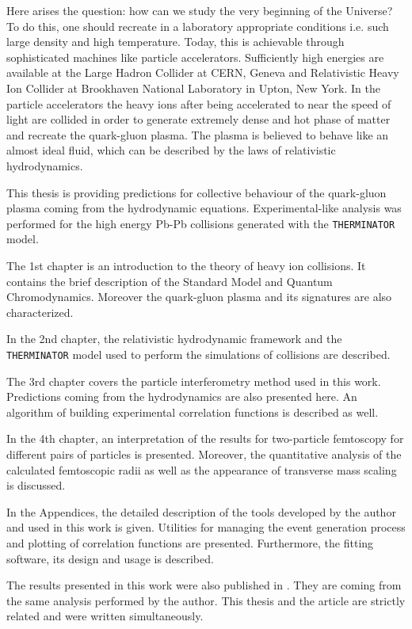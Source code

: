 Here arises the question: how can we study the very beginning of the Universe?
To do this, one should recreate in a laboratory appropriate conditions i.e. such large density and high temperature.
Today, this is achievable through sophisticated machines like particle accelerators.
Sufficiently high energies are available at the Large Hadron Collider at CERN, Geneva and Relativistic Heavy Ion Collider at Brookhaven National Laboratory in Upton, New York.
In the particle accelerators the heavy ions after being accelerated to near the speed of light are collided in order to generate extremely dense and hot phase of matter and recreate the quark-gluon plasma.
The plasma is believed to behave like an almost ideal fluid, which can be described by the laws of relativistic hydrodynamics.

This thesis is providing predictions for collective behaviour of the quark-gluon plasma coming from the hydrodynamic equations.
Experimental-like analysis was performed for the high energy Pb-Pb collisions generated with the \verb|THERMINATOR| model.

The 1st chapter is an introduction to the theory of heavy ion collisions.
It contains the brief description of the Standard Model and Quantum Chromodynamics.
Moreover the quark-gluon plasma and its signatures are also characterized.

In the 2nd chapter, the relativistic hydrodynamic framework and the \verb|THERMINATOR| model used to perform the simulations of collisions are described.

The 3rd chapter covers the particle interferometry method used in this work.
Predictions coming from the hydrodynamics are also presented here.
An algorithm of building experimental correlation functions is described as well.

In the 4th chapter, an interpretation of the results for two-particle femtoscopy for different pairs of particles is presented.
Moreover, the quantitative analysis of the calculated femtoscopic radii as well as the appearance of transverse mass scaling is discussed.

In the Appendices, the detailed description of the tools developed by the author and used in this work is given.
Utilities for managing the event generation process and plotting of correlation functions are presented.
Furthermore, the fitting software, its design and usage is described.

The results presented in this work were also published in \cite{galazyn}.
They are coming from the same analysis performed by the author.
This thesis and the article are strictly related and were written simultaneously.